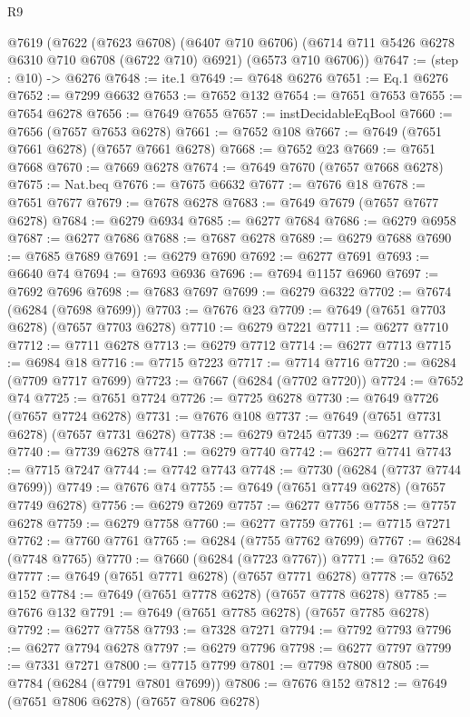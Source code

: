\begin{lexlean}{R9}
\begin{coremodule}
  @7619
    (@7622
      (@7623 @6708)
      (@6407 @710 @6706)
      (@6714 @711 @5426 @6278 @6310 @710 @6708 (@6722 @710) @6921)
      (@6573 @710 @6706))
@7647 := (step : @10) -> @6276
@7648 := ite.{1}
@7649 := @7648 @6276
@7651 := Eq.{1} @6276
@7652 := @7299 @6632
@7653 := @7652 @132
@7654 := @7651 @7653
@7655 := @7654 @6278
@7656 := @7649 @7655
@7657 := instDecidableEqBool
@7660 := @7656 (@7657 @7653 @6278)
@7661 := @7652 @108
@7667 := @7649 (@7651 @7661 @6278) (@7657 @7661 @6278)
@7668 := @7652 @23
@7669 := @7651 @7668
@7670 := @7669 @6278
@7674 := @7649 @7670 (@7657 @7668 @6278)
@7675 := Nat.beq
@7676 := @7675 @6632
@7677 := @7676 @18
@7678 := @7651 @7677
@7679 := @7678 @6278
@7683 := @7649 @7679 (@7657 @7677 @6278)
@7684 := @6279 @6934
@7685 := @6277 @7684
@7686 := @6279 @6958
@7687 := @6277 @7686
@7688 := @7687 @6278
@7689 := @6279 @7688
@7690 := @7685 @7689
@7691 := @6279 @7690
@7692 := @6277 @7691
@7693 := @6640 @74
@7694 := @7693 @6936
@7696 := @7694 @1157 @6960
@7697 := @7692 @7696
@7698 := @7683 @7697
@7699 := @6279 @6322
@7702 := @7674 (@6284 (@7698 @7699))
@7703 := @7676 @23
@7709 := @7649 (@7651 @7703 @6278) (@7657 @7703 @6278)
@7710 := @6279 @7221
@7711 := @6277 @7710
@7712 := @7711 @6278
@7713 := @6279 @7712
@7714 := @6277 @7713
@7715 := @6984 @18
@7716 := @7715 @7223
@7717 := @7714 @7716
@7720 := @6284 (@7709 @7717 @7699)
@7723 := @7667 (@6284 (@7702 @7720))
@7724 := @7652 @74
@7725 := @7651 @7724
@7726 := @7725 @6278
@7730 := @7649 @7726 (@7657 @7724 @6278)
@7731 := @7676 @108
@7737 := @7649 (@7651 @7731 @6278) (@7657 @7731 @6278)
@7738 := @6279 @7245
@7739 := @6277 @7738
@7740 := @7739 @6278
@7741 := @6279 @7740
@7742 := @6277 @7741
@7743 := @7715 @7247
@7744 := @7742 @7743
@7748 := @7730 (@6284 (@7737 @7744 @7699))
@7749 := @7676 @74
@7755 := @7649 (@7651 @7749 @6278) (@7657 @7749 @6278)
@7756 := @6279 @7269
@7757 := @6277 @7756
@7758 := @7757 @6278
@7759 := @6279 @7758
@7760 := @6277 @7759
@7761 := @7715 @7271
@7762 := @7760 @7761
@7765 := @6284 (@7755 @7762 @7699)
@7767 := @6284 (@7748 @7765)
@7770 := @7660 (@6284 (@7723 @7767))
@7771 := @7652 @62
@7777 := @7649 (@7651 @7771 @6278) (@7657 @7771 @6278)
@7778 := @7652 @152
@7784 := @7649 (@7651 @7778 @6278) (@7657 @7778 @6278)
@7785 := @7676 @132
@7791 := @7649 (@7651 @7785 @6278) (@7657 @7785 @6278)
@7792 := @6277 @7758
@7793 := @7328 @7271
@7794 := @7792 @7793
@7796 := @6277 @7794 @6278
@7797 := @6279 @7796
@7798 := @6277 @7797
@7799 := @7331 @7271
@7800 := @7715 @7799
@7801 := @7798 @7800
@7805 := @7784 (@6284 (@7791 @7801 @7699))
@7806 := @7676 @152
@7812 := @7649 (@7651 @7806 @6278) (@7657 @7806 @6278)

\end{coremodule}
\end{lexlean}

